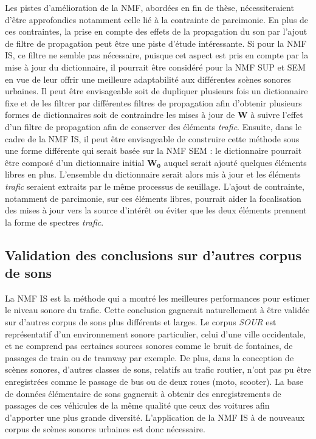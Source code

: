 Les pistes d'amélioration de la NMF, abordées en fin de thèse, nécessiteraient d'être approfondies notamment celle lié à la contrainte de parcimonie. 
En plus de ces contraintes, la prise en compte des effets de la propagation du son par l'ajout de filtre de propagation peut être une piste d'étude intéressante. Si pour la NMF IS, ce filtre ne semble pas nécessaire, puisque cet aspect est pris en compte par la mise à jour du dictionnaire, il pourrait être considéré pour la NMF SUP et SEM en vue de leur offrir une meilleure adaptabilité aux différentes scènes sonores urbaines. Il peut être envisageable soit de dupliquer plusieurs fois un dictionnaire fixe et de les filtrer par différentes filtres de propagation afin d'obtenir plusieurs formes de dictionnaires soit de contraindre les mises à jour de $\mathbf{W}$ à suivre l'effet d'un filtre de propagation afin de conserver des éléments \textit{trafic}.
Ensuite, dans le cadre de la NMF IS, il peut être envisageable de construire cette méthode sous une forme différente qui serait basée sur la NMF SEM : le dictionnaire pourrait être composé d'un dictionnaire initial $\mathbf{W_0}$ auquel serait ajouté quelques éléments libres en plus. L'ensemble du dictionnaire serait alors mis à jour et les éléments \textit{trafic} seraient extraits par le même processus de seuillage. L'ajout de contrainte, notamment de parcimonie, sur ces éléments libres, pourrait aider la focalisation des mises à jour vers la source d'intérêt ou éviter que les deux éléments prennent la forme de spectres \textit{trafic}.

\subsection*{Validation des conclusions sur d'autres corpus de sons}
La NMF IS  est la méthode qui a montré les meilleures performances pour estimer le niveau sonore du trafic.  Cette conclusion gagnerait naturellement à être validée sur d'autres corpus de sons plus différents et larges. Le corpus \textit{SOUR} est représentatif d'un environnement sonore particulier, celui d'une ville occidentale, et ne comprend pas certaines sources sonores comme le bruit de fontaines, de passages de train ou de tramway par exemple. De plus, dans la conception de scènes sonores, d'autres classes de sons, relatifs au trafic routier, n'ont pas pu être enregistrées comme le passage de bus ou de deux roues (moto, scooter). La base de données élémentaire de sons gagnerait à obtenir des enregistrements de passages de ces véhicules de la même qualité que ceux des voitures afin d'apporter une plus grande diversité. L'application de la NMF IS à de nouveaux corpus de scènes sonores urbaines est donc nécessaire.

